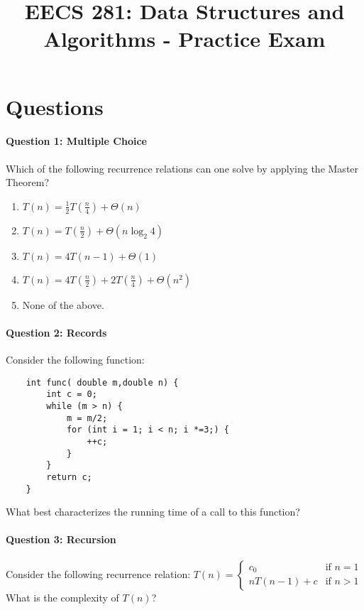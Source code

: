 \documentclass{article}
\begin{document}
\title{EECS 281: Data Structures and Algorithms - Practice Exam}
\date{}
\maketitle

\section*{Questions}

\paragraph{Question 1: Multiple Choice}
Which of the following recurrence relations can one solve by applying the Master Theorem?
\begin{enumerate}[label=\Alph*.]
\item $T(n) = \frac{1}{2}T(\frac{n}{4}) + \Theta(n)$
\item $T(n) = T(\frac{n}{2}) + \Theta(n\log_{2}4)$
\item $T(n) = 4T(n - 1) + \Theta(1)$
\item $T(n) = 4T(\frac{n}{2}) + 2T(\frac{n}{4}) + \Theta(n^{2})$
\item None of the above.
\end{enumerate}

\paragraph{Question 2: Records}
Consider the following function:
\begin{verbatim}
    int func( double m,double n) {
    	int c = 0;
    	while (m > n) {
    		m = m/2;
    		for (int i = 1; i < n; i *=3;) {
    			++c;
    		}
    	}
    	return c;
    }
\end{verbatim}
What best characterizes the running time of a call to this function?

\paragraph{Question 3: Recursion}
Consider the following recurrence relation:
$T(n) = 
\begin{cases} 
      c_{0} & \text{if } n = 1 \\
      nT(n -1) + c & \text{if } n > 1 
   \end{cases}
$
What is the complexity of $T(n)$?
\end{document}
